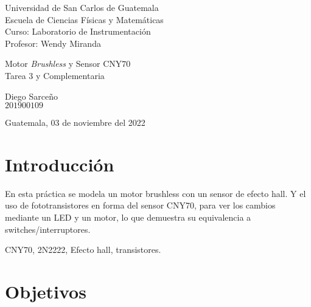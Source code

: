 \documentclass[conference]{IEEEtran}
\begin{document}
\begin{titlepage}



\begin{flushleft}
    Universidad de San Carlos de Guatemala \\
    Escuela de Ciencias Físicas y Matemáticas \\
    Curso: Laboratorio de Instrumentación \\
    Profesor: Wendy Miranda
\end{flushleft}

\vspace{6cm}

\begin{center}
    \huge{Motor \textit{Brushless}} y Sensor CNY$70$ \\[1cm]
    \large{Tarea 3 y Complementaria}
\end{center}

\vspace{10.5cm}

\begin{flushright}
    Diego Sarceño \\
    $201900109$
\end{flushright}

\vspace{0.5cm}

\begin{center}
    Guatemala, 03 de noviembre del 2022
\end{center}

\end{titlepage}



\section{Introducción}
    En esta práctica se modela un motor brushless con un sensor de efecto hall. Y el uso de fototransistores en forma del sensor CNY70, para ver los cambios mediante un LED y un motor, lo que demuestra su equivalencia a switches/interruptores.


\begin{IEEEkeywords}
    CNY70, 2N2222, Efecto hall, transistores.
\end{IEEEkeywords}

\section{Objetivos}
\end{document}
